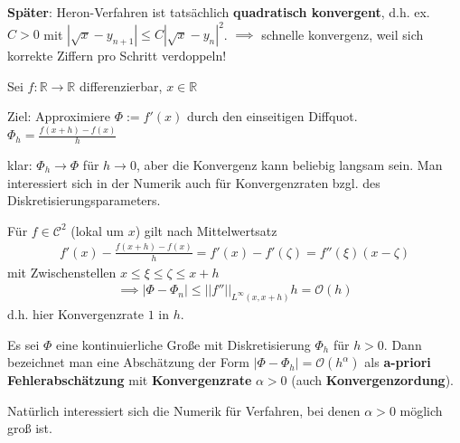 \textbf{Später}: Heron-Verfahren ist tatsächlich \textbf{quadratisch konvergent}, d.h. ex. $C>0$ mit $|\sqrt{x}-y_{n+1}| \leq C |\sqrt{x}-y_n|^2$. $\implies$ schnelle konvergenz, weil sich korrekte Ziffern pro Schritt verdoppeln!

\begin{example}
	Sei $f:\mathbb{R} \rightarrow \mathbb{R}$ differenzierbar, $x\in \mathbb{R}$
	
	Ziel: Approximiere $\Phi:=f'(x)$ durch den einseitigen Diffquot. $\Phi_h = \frac{f(x+h)-f(x)}{h}$
	
	klar: $\Phi_h \rightarrow \Phi$ für $h \rightarrow 0$, aber die Konvergenz kann beliebig langsam sein. Man interessiert sich in der Numerik auch für Konvergenzraten bzgl. des Diskretisierungsparameters.
	
	Für $f \in \mathcal{C}^2$ (lokal um $x$) gilt nach Mittelwertsatz
	\begin{align*}
		f'(x) - \frac{f(x+h)-f(x)}{h} = f'(x) - f'(\zeta) = f''(\xi)(x-\zeta)
	\end{align*}
	mit Zwischenstellen $x \leq \xi \leq \zeta \leq x+h$
	\begin{align*}
		\implies |\Phi - \Phi_n| \leq ||f''||_{L^{\infty}(x,x+h)} h = \mathcal{O} (h)
	\end{align*}
	d.h. hier Konvergenzrate $1$ in $h$.
\end{example}

\begin{definition}
	Es sei $\Phi$ eine kontinuierliche Große mit Diskretisierung $\Phi_h$ für $h>0$. Dann bezeichnet man eine Abschätzung der Form $|\Phi - \Phi_h| = \mathcal{O}(h^\alpha)$ als \textbf{a-priori Fehlerabschätzung} mit \textbf{Konvergenzrate} $\alpha > 0$ (auch \textbf{Konvergenzordung}).
\end{definition}

Natürlich interessiert sich die Numerik für Verfahren, bei denen $\alpha > 0$ möglich groß ist.

